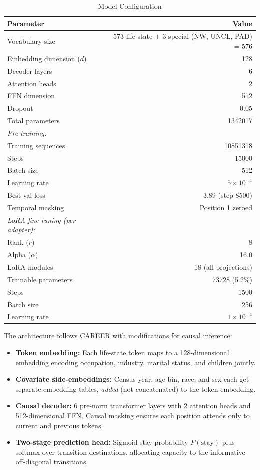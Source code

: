\documentclass[12pt]{article}
\begin{document}
\begin{table}[H]
\centering
\caption{Model Configuration}
\label{tab:config}
\begin{tabular}{lr}
\toprule
Parameter & Value \\
\midrule
Vocabulary size & 573 life-state + 3 special (NW, UNCL, PAD) = 576 \\
Embedding dimension ($d$) & 128 \\
Decoder layers & 6 \\
Attention heads & 2 \\
FFN dimension & 512 \\
Dropout & 0.05 \\
Total parameters & \num{1342017} \\
\addlinespace
\textit{Pre-training:} & \\
\quad Training sequences & \num{10851318} \\
\quad Steps & \num{15000} \\
\quad Batch size & 512 \\
\quad Learning rate & $5 \times 10^{-4}$ \\
\quad Best val loss & 3.89 (step \num{8500}) \\
\quad Temporal masking & Position 1 zeroed \\
\addlinespace
\textit{LoRA fine-tuning (per adapter):} & \\
\quad Rank ($r$) & 8 \\
\quad Alpha ($\alpha$) & 16.0 \\
\quad LoRA modules & 18 (all projections) \\
\quad Trainable parameters & \num{73728} (5.2\%) \\
\quad Steps & \num{1500} \\
\quad Batch size & 256 \\
\quad Learning rate & $1 \times 10^{-4}$ \\
\bottomrule
\end{tabular}
\end{table}

The architecture follows CAREER \citep{vafa2022} with modifications for causal inference:
\begin{itemize}
    \item \textbf{Token embedding:} Each life-state token maps to a 128-dimensional embedding encoding occupation, industry, marital status, and children jointly.
    \item \textbf{Covariate side-embeddings:} Census year, age bin, race, and sex each get separate embedding tables, \textit{added} (not concatenated) to the token embedding.
    \item \textbf{Causal decoder:} 6 pre-norm transformer layers with 2 attention heads and 512-dimensional FFN. Causal masking ensures each position attends only to current and previous tokens.
    \item \textbf{Two-stage prediction head:} Sigmoid stay probability $P(\text{stay})$ plus softmax over transition destinations, allocating capacity to the informative off-diagonal transitions.
\end{itemize}
\end{document}
